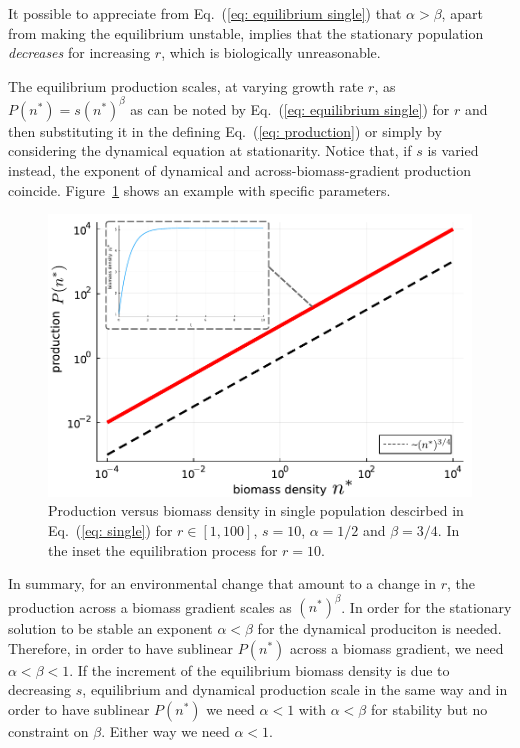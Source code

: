 \documentclass[10pt]{article}
\begin{document}
It possible to appreciate from Eq.~(\ref{eq: equilibrium single})
that $\alpha>\beta$, apart from making the equilibrium unstable, implies that
the stationary population \textit{decreases} for increasing $r$,
which is biologically unreasonable.

The equilibrium production scales, at varying growth rate $r$,
as $P(n^*)=s(n^*)^\beta$ as can be noted by Eq.~(\ref{eq: equilibrium single})
for $r$ and then substituting it in the defining Eq.~(\ref{eq: production})
or simply by considering the dynamical equation at stationarity.
Notice that, if $s$ is varied instead, the exponent
of dynamical and across-biomass-gradient production coincide.
Figure~\ref{fig. example} shows an example with specific parameters.

\begin{figure}[h!]
    \centering
    \includegraphics[width=.8\textwidth]{fig/single-pop.pdf}
    \caption{Production versus biomass density in single population descirbed in
    Eq.~(\ref{eq: single}) for $r\in[1,100]$,
    $s=10$, $\alpha=1/2$ and $\beta=3/4$. In the inset the equilibration process
    for $r=10$.}
    \label{fig. example}
\end{figure}

In summary, for an environmental change that amount to a change in $r$, 
the production across a biomass gradient 
scales as $(n^*)^\beta$. In order for
the stationary solution to be stable an exponent $\alpha<\beta$
for the dynamical produciton is needed.
Therefore, in order to have sublinear $P(n^*)$ across a biomass gradient,
we need $\alpha<\beta<1$.
If the increment of the equilibrium biomass density is due to decreasing $s$,
equilibrium and dynamical production scale in the same way and in order to
have sublinear $P(n^*)$ we need $\alpha<1$ with $\alpha<\beta$ for stability
but no constraint on $\beta$. Either way we need $\alpha<1$.
\end{document}
